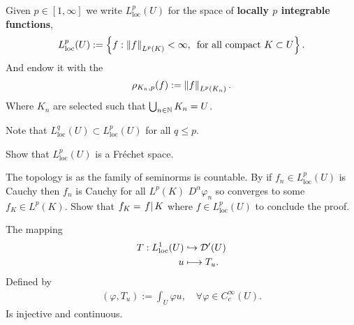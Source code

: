 \documentclass[
    a4paper,
    DIV=14,
    abstract=true,
    numbers=noenddot
]{scrartcl}
\begin{document}
\begin{definition}
	Given $p\in [1,\infty]$ we write $L^p_{\mathrm{loc}}(U)$ for the space of \textbf{locally $p$ integrable functions},
	\begin{align*}
		L^p_{\mathrm{loc}}(U):= \left\{f: \left\lVert f \right\rVert_{L^p(K)}< \infty, \,\text{   for all compact }  K \subset U\right\}.
	\end{align*}
	And endow it with the 
	\begin{align*}
		\rho_{K_n,p}(f):= \left\lVert f \right\rVert_{L^p(K_n)}.
	\end{align*}
	Where $K_n$ are selected such that
	$\bigcup_{n \in \mathbb{N}} K_n =U$.
\end{definition}
Note that $L^q_{\mathrm{loc}}(U) \subset L^p_{\mathrm{loc} }(U)$ for all $q \leq p$.
\begin{exercise}
	Show that $L^p_{\mathrm{loc} }(U)$ is a Fréchet space.
\end{exercise}
\begin{hint}
	The topology is  as the family of seminorms is countable. By   if $f_n \in L^p_{\mathrm{loc}}(U)$ is Cauchy then $f_n$ is Cauchy for all  $L^p(K)$ $D^\alpha \varphi_n $ so converges to some $f_K \in L^p(K)$. Show that $f_K= \left.f\right|{K}$ where $f \in L^p_{\mathrm{loc}}(U)$    to conclude the proof.
\end{hint}
\begin{theorem}\label{motivation}
	The mapping
	\begin{align*}
		T:L^1_{\mathrm{loc}}(U) & \hookrightarrow  \mathcal{D}'(U) \\
		u                       & \longmapsto     T_u
		.\end{align*}
	Defined by
	\begin{align}\label{duality}
		(\varphi,T_u):= \int_{U}\varphi u   , \quad\forall \varphi\in C_c^\infty(U).
	\end{align}
	Is injective and continuous.    \end{theorem}
\end{document}
